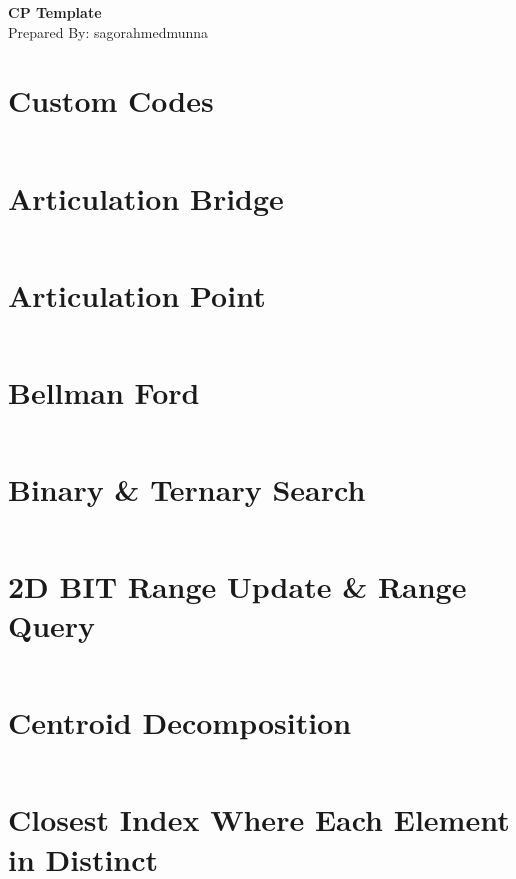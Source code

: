 \documentclass[10pt,a4paper,landscape]{article}
\begin{document}
	
	\begin{center}
		{\LARGE\textbf{CP Template}}\\[8pt]
		{\large Prepared By: sagorahmedmunna}\\
	\end{center}

	\begin{multicols*}{3}
	
	\tableofcontents
	\newpage
	

		
		\section{Custom Codes}
		\inputminted{cpp}{codes/0custom.cpp}
		
		\section{Articulation Bridge}
		\inputminted{cpp}{codes/ARTICULATION_BRIDGE.cpp}
		
		\section{Articulation Point}
		\inputminted{cpp}{codes/ARTICULATION_POINT.cpp}
		
		\section{Bellman Ford}
		\inputminted{cpp}{codes/BELLMAN_FORD.cpp}

		
		\section{Binary \& Ternary Search}
		\inputminted{cpp}{codes/BINARY_AND_TERNARY_SEARCH.cpp}
		
		\section{2D BIT Range Update \& Range Query}
		\inputminted{cpp}{codes/BIT_2D_RANGE_UPDATE_RANGE_QUERY.cpp}
		
		\section{Centroid Decomposition}
		\inputminted{cpp}{codes/CENTROID_DECOMPOSITION.cpp}
		
		\section{Closest Index Where Each Element in Distinct}
		\inputminted{cpp}{codes/CLOSEST_INDEX_WHERE_EACH_ELEMENT_IS_DISTINCT.cpp}
		

\end{multicols*}
\end{document}
